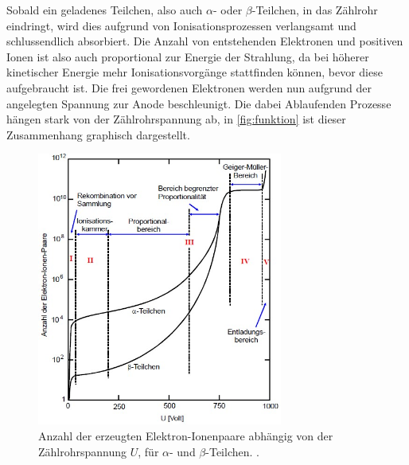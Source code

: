 Sobald ein geladenes Teilchen, also auch $\alpha$- oder $\beta$-Teilchen, in das Zählrohr eindringt, wird dies
aufgrund von Ionisationsprozessen verlangsamt und schlussendlich absorbiert.
Die Anzahl von entstehenden Elektronen und positiven Ionen ist also auch proportional zur Energie der Strahlung,
da bei höherer kinetischer Energie mehr Ionisationsvorgänge stattfinden können, bevor diese aufgebraucht ist.
Die frei gewordenen Elektronen werden nun aufgrund der angelegten Spannung zur Anode beschleunigt.
Die dabei Ablaufenden Prozesse hängen stark von der Zählrohrspannung ab, in \autoref{fig:funktion} ist dieser
Zusammenhang graphisch dargestellt.

\begin{figure}[H]
    \centering
    \includegraphics[height=9cm]{content/pics/funktion.jpg}
    \caption{Anzahl der erzeugten Elektron-Ionenpaare abhängig von der Zählrohrspannung $U$,
    für $\alpha$- und $\beta$-Teilchen. \cite{v703}.}
    \label{fig:funktion}
\end{figure}


